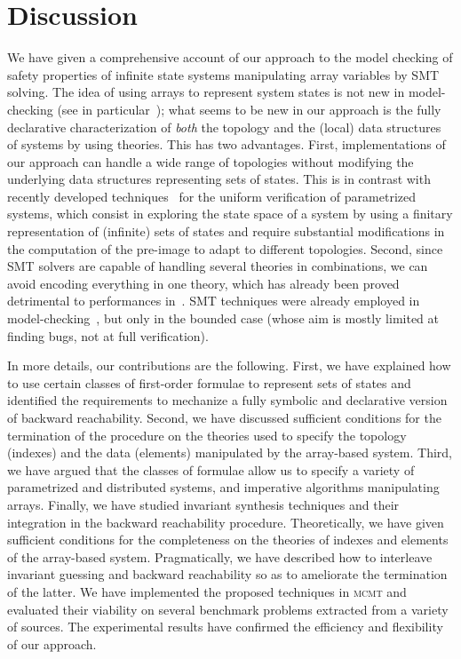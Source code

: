 \documentclass{LMCS}
\theoremstyle{plain}\newtheorem{assumption}[thm]{Assumption}
\theoremstyle{plain}\newtheorem{proposition}[thm]{Proposition}
\theoremstyle{plain}\newtheorem{property}[thm]{Property}
\theoremstyle{plain}\newtheorem{example}[thm]{Example}
\theoremstyle{plain}\newtheorem{claim}[thm]{Claim}
\theoremstyle{plain}\newtheorem{lemma}[thm]{Lemma}
\begin{document}
\section{Discussion}
\label{sec:discussion}
We have given a comprehensive account of our approach to the model
checking of safety properties of infinite state systems manipulating
array variables by SMT solving.  The idea of using arrays to represent
system states is not new in model-checking (see in
particular~\cite{L2,L1}); what seems to be new in our approach is the
fully declarative characterization of \emph{both} the topology and the
(local) data structures of systems by using theories.  This has two
advantages.  First, implementations of our approach can handle a wide
range of topologies without modifying the underlying data structures
representing sets of states.  This is in contrast with recently
developed techniques~\cite{tacas06,cav06} for the uniform verification
of parametrized systems, which consist in exploring the state space of
a system by using a finitary representation of (infinite) sets of
states and require substantial modifications in the computation of the
pre-image to adapt to different topologies.  Second, since SMT solvers
are capable of handling several theories in combinations, we can avoid
encoding everything in one theory, which has already been proved
detrimental to performances in~\cite{bultan-gerber-pugh,composite-mc}.
SMT techniques were already employed in
model-checking~\cite{demoura-bounded,armando-boundedmc-and-smt}, but
only in the bounded case (whose aim is mostly limited at finding bugs,
not at full verification).

In more details, our contributions are the following.  First, we have
explained how to use certain classes of first-order formulae to
represent sets of states and identified the requirements to mechanize
a fully symbolic and declarative version of backward reachability.
Second, we have discussed sufficient conditions for the termination of
the procedure on the theories used to specify the topology (indexes)
and the data (elements) manipulated by the array-based system.  Third,
we have argued that the classes of formulae allow us to specify a
variety of parametrized and distributed systems, and imperative
algorithms manipulating arrays.  Finally, we have studied invariant
synthesis techniques and their integration in the backward
reachability procedure.  Theoretically, we have given sufficient
conditions for the completeness on the theories of indexes and
elements of the array-based system.  Pragmatically, we have described
how to interleave invariant guessing and backward reachability so as
to ameliorate the termination of the latter.  We have implemented the
proposed techniques in \textsc{mcmt} and evaluated their viability on
several benchmark problems extracted from a variety of sources.  The
experimental results have confirmed the efficiency and flexibility of
our approach.
\end{document}
